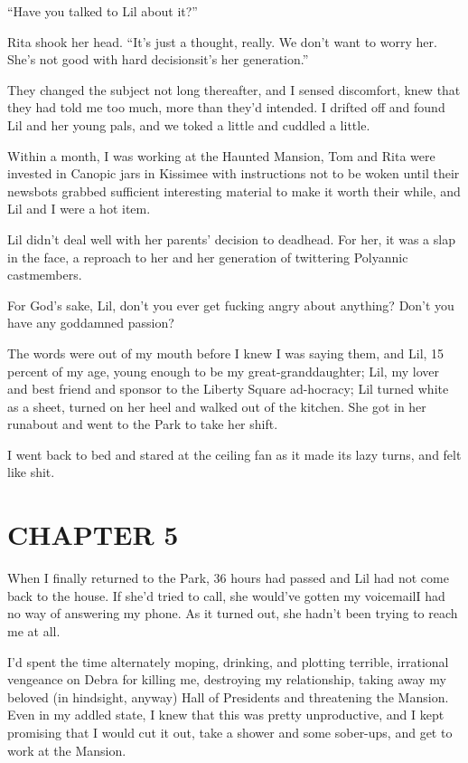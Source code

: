 “Have you talked to Lil about it?”

Rita shook her head. “It's just a thought, really. We don't want to
worry her. She's not good with hard decisions{\dash}it's her
generation.”

They changed the subject not long thereafter, and I sensed
discomfort, knew that they had told me too much, more than they'd
intended. I drifted off and found Lil and her young pals, and we
toked a little and cuddled a little.

Within a month, I was working at the Haunted Mansion, Tom and Rita
were invested in Canopic jars in Kissimee with instructions not to
be woken until their newsbots grabbed sufficient interesting
material to make it worth their while, and Lil and I were a hot
item.

Lil didn't deal well with her parents' decision to deadhead. For
her, it was a slap in the face, a reproach to her and her
generation of twittering Polyannic castmembers.

For God's sake, Lil, don't you ever get fucking angry about
anything? Don't you have any goddamned passion?

The words were out of my mouth before I knew I was saying them, and
Lil, 15 percent of my age, young enough to be my
great-granddaughter; Lil, my lover and best friend and sponsor to
the Liberty Square ad-hocracy; Lil turned white as a sheet, turned
on her heel and walked out of the kitchen. She got in her runabout
and went to the Park to take her shift.

I went back to bed and stared at the ceiling fan as it made its
lazy turns, and felt like shit.

\section{CHAPTER 5}

When I finally returned to the Park, 36 hours had passed and Lil
had not come back to the house. If she'd tried to call, she
would've gotten my voicemail{\dash}I had no way of answering my phone. As
it turned out, she hadn't been trying to reach me at all.

I'd spent the time alternately moping, drinking, and plotting
terrible, irrational vengeance on Debra for killing me, destroying
my relationship, taking away my beloved (in hindsight, anyway) Hall
of Presidents and threatening the Mansion. Even in my addled state,
I knew that this was pretty unproductive, and I kept promising that
I would cut it out, take a shower and some sober-ups, and get to
work at the Mansion.

